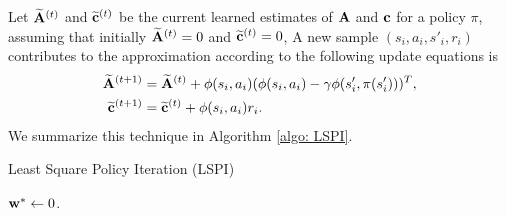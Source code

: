 Let $\widetilde{{\mathbf A}}^{(t)}$ and $\widetilde{{\mathbf c}}^{(t)}$ be the current learned estimates of ${\mathbf A}$ and ${\mathbf c}$ for a policy $\pi$, assuming that initially $\widetilde{{\mathbf A}}^{(t)} = 0$ and $\widetilde{{\mathbf c}}^{(t)} = 0$, A new sample $(s_i,a_i,s'_i,r_i)$ contributes to the approximation according to the following update equations is
\begin{align}
    \widetilde{{\mathbf A}}^{(t+1)} &= \widetilde{{\mathbf A}}^{(t)} + \phi(s_i,a_i)(\phi(s_i,a_i)-\gamma\phi(s'_i,\pi(s'_i)))^T,\\
    \widetilde{{\mathbf c}}^{(t+1)} &= \widetilde{{\mathbf c}}^{(t)} + \phi(s_i,a_i)r_i.
\end{align}
We summarize this technique in Algorithm \ref{algo: LSPI}.

\begin{algorithm}[H]
    \caption{Least Square Policy Iteration (LSPI)}
    \label{algo: LSPI}
    ${\mathbf w}^* \leftarrow 0$.\\
\end{algorithm}
